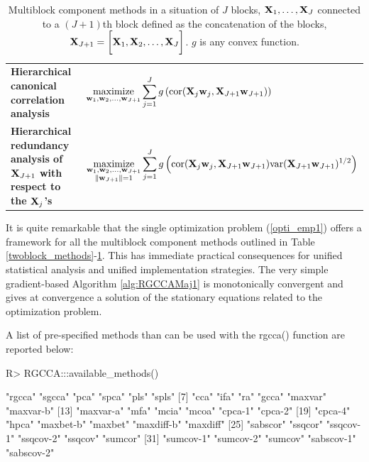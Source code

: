 \documentclass[
]{jss}
\begin{document}
\begin{landscape}
\begin{table}[!ht]
\begin{tabular}{p{7cm}p{13cm}}
\textbf{Hierarchical canonical correlation analysis} \citep{Tenenhaus2011}& 
$ \underset{\mathbf{w}_1, \mathbf{w}_2, \ldots,\mathbf{w}_{J+1}}{\text{maximize}} \displaystyle \sum_{j=1}^J g \left(\text{cor}(\mathbf{X}_j\mathbf{w}_j, \mathbf{X}_{J+1}\mathbf{w}_{J+1})\right) $\\

\textbf{Hierarchical redundancy analysis of $\mathbf{X}_{J+1}$ with respect to the $\mathbf{X}_j$'s} \citep{Tenenhaus2011}&  
$\underset{\substack{\mathbf{w}_1, \mathbf{w}_2, \ldots,\mathbf{w}_{J+1} \\ \Vert \mathbf{w}_{J+1} \Vert =1}}{\text{maximize}} \displaystyle \sum_{j=1}^J g \left(\text{cor}(\mathbf{X}_j\mathbf{w}_j, \mathbf{X}_{J+1}\mathbf{w}_{J+1})\text{var}(\mathbf{X}_{J+1}\mathbf{w}_{J+1})^{1/2} \right) $\\

\hline
\end{tabular}
\caption{Multiblock component methods in a situation of $J$ blocks, $\mathbf{X}_1, \ldots, \mathbf{X}_J$ connected to a $(J + 1)$th block defined as the concatenation of the blocks, $\mathbf{X}_{J+1} = \bigg[\mathbf{X}_1 , \mathbf{X}_2, \ldots, \mathbf{X}_J \bigg]$. $g$ is any convex function. \label{multiblock_hierarchical}}
\end{table}
\end{landscape}

It is quite remarkable that the single optimization problem
(\ref{opti_emp1}) offers a framework for all the multiblock component
methods outlined in Table
\ref{twoblock_methods}-\ref{multiblock_hierarchical}. This has immediate
practical consequences for unified statistical analysis and unified
implementation strategies. The very simple gradient-based Algorithm
\ref{alg:RGCCAMaj1} is monotonically convergent and gives at convergence
a solution of the stationary equations related to the optimization
problem.

A list of pre-specified methods than can be used with the rgcca()
function are reported below:

\footnotesize

\begin{CodeChunk}
\begin{CodeInput}
R> RGCCA:::available_methods()
\end{CodeInput}
\begin{CodeOutput}
 [1] "rgcca"     "sgcca"     "pca"       "spca"      "pls"       "spls"     
 [7] "cca"       "ifa"       "ra"        "gcca"      "maxvar"    "maxvar-b" 
[13] "maxvar-a"  "mfa"       "mcia"      "mcoa"      "cpca-1"    "cpca-2"   
[19] "cpca-4"    "hpca"      "maxbet-b"  "maxbet"    "maxdiff-b" "maxdiff"  
[25] "sabscor"   "ssqcor"    "ssqcov-1"  "ssqcov-2"  "ssqcov"    "sumcor"   
[31] "sumcov-1"  "sumcov-2"  "sumcov"    "sabscov-1" "sabscov-2"
\end{CodeOutput}
\end{CodeChunk}
\end{document}
